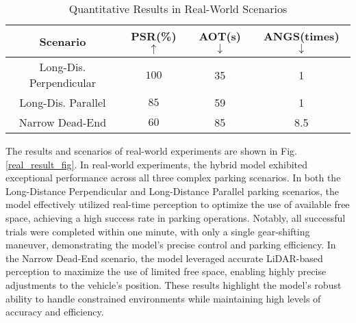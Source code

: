 \documentclass[ conference]{./support/ieeeconf}
\begin{document}
\begin{table}[t]
    \centering
    \caption{Quantitative Results in Real-World Scenarios}
    \begin{tabular}{c|c|c|c}

















    
    \toprule
    \textbf{Scenario} & \textbf{PSR(\%) $\uparrow$} & \textbf{AOT(s) $\downarrow$} & \textbf{ANGS(times) $\downarrow$} \\
    \midrule
    Long-Dis. Perpendicular &  $100$ & 35 & 1 \\
    Long-Dis. Parallel      &  $85$ & 59 & 1 \\
    Narrow Dead-End         &  $60$  & 85 & 8.5 \\
    \midrule
    \end{tabular}
    \vspace{-1cm}
\end{table}

The results and scenarios of real-world experiments are shown in Fig. \ref{real_result_fig}. In real-world experiments, the hybrid model exhibited exceptional performance across all three complex parking scenarios. 
In both the Long-Distance Perpendicular and Long-Distance Parallel parking scenarios, the model effectively utilized real-time perception to optimize the use of available free space, achieving a high success rate in parking operations. 
Notably, all successful trials were completed within one minute, with only a single gear-shifting maneuver, demonstrating the model's precise control and parking efficiency. 
In the Narrow Dead-End scenario, the model leveraged accurate LiDAR-based perception to maximize the use of limited free space, enabling highly precise adjustments to the vehicle's position. 
These results highlight the model's robust ability to handle constrained environments while maintaining high levels of accuracy and efficiency.
\end{document}

